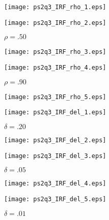 \documentclass[11pt, letterpaper]{scrartcl}
\begin{document}
\begin{figure}[!ht]
\centering
\caption{\textbf{$\rho = .25$}}
\texttt{[image: ps2q3\_IRF\_rho\_1.eps]}

\centering
\caption{\textbf{$\rho = .50$}}
\texttt{[image: ps2q3\_IRF\_rho\_2.eps]}
\end{figure}

\pagebreak

\begin{figure}[!ht]
\centering
\caption{\textbf{$\rho = .75$}}
\texttt{[image: ps2q3\_IRF\_rho\_3.eps]}

\centering
\caption{\textbf{$\rho = .90$}}
\texttt{[image: ps2q3\_IRF\_rho\_4.eps]}
\end{figure}

\pagebreak

\begin{figure}[!ht]
\centering
\caption{\textbf{$\rho = 1.00$}}
\texttt{[image: ps2q3\_IRF\_rho\_5.eps]}

\centering
\caption{\textbf{$\delta = .20$}}
\texttt{[image: ps2q3\_IRF\_del\_1.eps]}
\end{figure}

\pagebreak

\begin{figure}[!ht]
\centering
\caption{\textbf{$\delta = .10$}}
\texttt{[image: ps2q3\_IRF\_del\_2.eps]}

\centering
\caption{\textbf{$\delta = .05$}}
\texttt{[image: ps2q3\_IRF\_del\_3.eps]}
\end{figure}

\pagebreak

\begin{figure}[!ht]
\centering
\caption{\textbf{$\delta = .02$}}
\texttt{[image: ps2q3\_IRF\_del\_4.eps]}

\centering
\caption{\textbf{$\delta = .01$}}
\texttt{[image: ps2q3\_IRF\_del\_5.eps]}
\end{figure}
\end{document}
